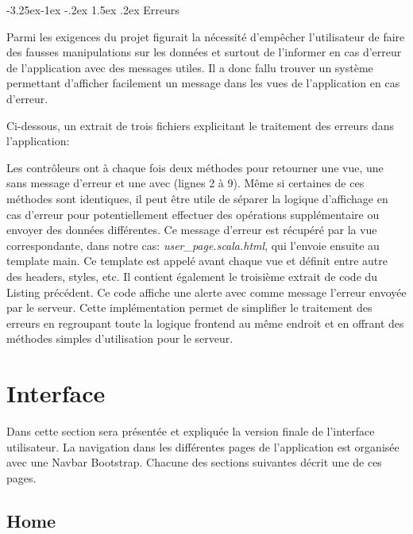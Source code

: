 \documentclass[french]{article}
\makeatletter
\renewcommand\paragraph{\@startsection{paragraph}{4}{\z@}%
                                     {-3.25ex\@plus -1ex \@minus -.2ex}%
                                     {1.5ex \@plus .2ex}%
                                     {\normalfont\normalsize\bfseries}}
\makeatother
\begin{document}
\paragraph{Erreurs}

Parmi les exigences du projet figurait la nécessité d'empêcher l'utilisateur de faire des fausses manipulations sur les données et surtout de l'informer en cas d'erreur de l'application avec des messages utiles. Il a donc fallu trouver un système permettant d'afficher facilement un message dans les vues de l'application en cas d'erreur. \newline

Ci-dessous, un extrait de trois fichiers explicitant le traitement des erreurs dans l'application:



Les contrôleurs ont à chaque fois deux méthodes pour retourner une vue, une sans message d'erreur et une avec (lignes 2 à 9). Même si certaines de ces méthodes sont identiques, il peut être utile de séparer la logique d'affichage en cas d'erreur pour potentiellement effectuer des opérations supplémentaire ou envoyer des données différentes. \newline
Ce message d'erreur est récupéré par la vue correspondante, dans notre cas: \textit{user\_page.scala.html}, qui l'envoie ensuite au template main. Ce template est appelé avant chaque vue et définit entre autre des headers, styles, etc. Il contient également le troisième extrait de code du Listing précédent. Ce code affiche une alerte avec comme message l'erreur envoyée par le serveur. Cette implémentation permet de simplifier le traitement des erreurs en regroupant toute la logique frontend au même endroit et en offrant des méthodes simples d'utilisation pour le serveur.

\newpage
\section{Interface}

Dans cette section sera présentée et expliquée la version finale de l'interface utilisateur. \newline
La navigation dans les différentes pages de l'application est organisée avec une Navbar Bootstrap. Chacune des sections suivantes décrit une de ces pages.  

\subsection{Home}
\end{document}
